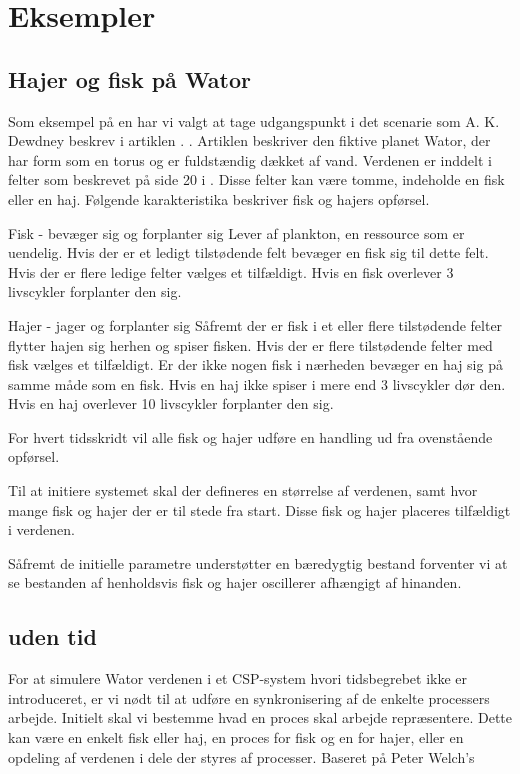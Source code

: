 \chapter{Eksempler}

\section{Hajer og fisk på Wator} Som eksempel på en \des har vi valgt at tage 
udgangspunkt i det scenarie som A. K. Dewdney
beskrev i artiklen \cite{wator}. . Artiklen beskriver 
den
fiktive planet Wator, der har form som en torus og er fuldstændig
dækket af vand. Verdenen er inddelt i felter som beskrevet på side
20 i . Disse felter kan være tomme, indeholde en
fisk eller en haj. Følgende karakteristika beskriver fisk og hajers
opførsel.


Fisk - bevæger sig og forplanter sig Lever af plankton, en ressource
som er uendelig. Hvis der er et ledigt tilstødende felt bevæger en
fisk sig til dette felt. Hvis der er flere ledige felter vælges et
tilfældigt. Hvis en fisk overlever 3 livscykler forplanter den sig.


Hajer - jager og forplanter sig Såfremt der er fisk i et eller flere
tilstødende felter flytter hajen sig herhen og spiser fisken. Hvis der
er flere tilstødende felter med fisk vælges et tilfældigt. Er der
ikke nogen fisk i nærheden bevæger en haj sig på samme måde som en
fisk. Hvis en haj ikke spiser i mere end 3 livscykler dør den. Hvis en
haj overlever 10 livscykler forplanter den sig.

For hvert tidsskridt vil alle fisk og hajer udføre en handling ud fra
ovenstående opførsel.

Til at initiere systemet skal der defineres en størrelse af verdenen,
samt hvor mange fisk og hajer der er til stede fra start. Disse fisk og
hajer placeres tilfældigt i verdenen.

Såfremt de initielle parametre understøtter en bæredygtig bestand
forventer vi at se bestanden af henholdsvis fisk og hajer oscillerer
afhængigt af hinanden.


\section{uden tid}
For at simulere Wator verdenen i et CSP-system hvori tidsbegrebet ikke er 
introduceret, er vi nødt til at udføre en synkronisering af de enkelte 
processers arbejde. Initielt skal vi bestemme hvad en proces skal arbejde 
repræsentere. Dette kan være en enkelt fisk eller haj, en proces for fisk og en 
for hajer, eller en opdeling af verdenen i dele der styres af processer.
Baseret på Peter Welch's




